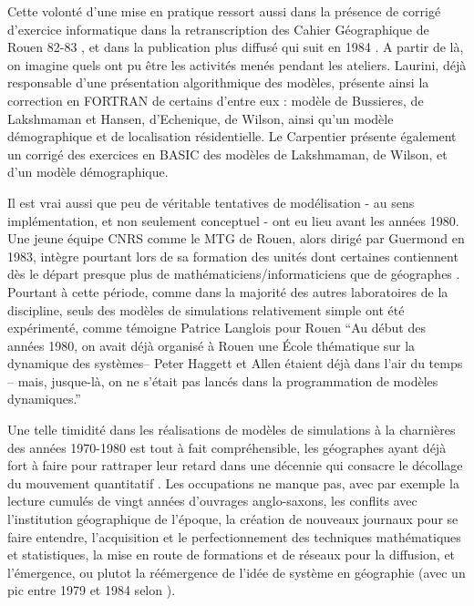 Cette volonté d'une mise en pratique ressort aussi dans la présence de corrigé d'exercice informatique dans la retranscription des Cahier Géographique de Rouen 82-83 \autocite{CGR1983}, et dans la publication plus diffusé qui suit en 1984 \autocite{Guermond1984}. A partir de là, on imagine quels ont pu être les activités menés pendant les ateliers. Laurini, déjà responsable d'une présentation algorithmique des modèles, présente ainsi la correction en FORTRAN de certains d'entre eux : modèle de Bussieres, de Lakshmaman et Hansen, d'Echenique, de Wilson, ainsi qu'un modèle démographique et de localisation résidentielle. Le Carpentier présente également un corrigé des exercices en BASIC des modèles de Lakshmaman, de Wilson, et d'un modèle démographique.

Il est vrai aussi que peu de véritable tentatives de modélisation - au sens implémentation, et non seulement conceptuel - ont eu lieu avant les années 1980. Une jeune équipe CNRS comme le MTG de Rouen, alors dirigé par Guermond en 1983, intègre pourtant lors de sa formation des unités dont certaines contiennent dès le départ presque plus de mathématiciens/informaticiens que de géographes . Pourtant à cette période, comme dans la majorité des autres laboratoires de la discipline, seuls des modèles de simulations relativement simple ont été expérimenté, comme témoigne Patrice Langlois pour Rouen \enquote{Au début des années 1980, on avait déjà organisé à Rouen une École thématique sur la dynamique des systèmes– Peter Haggett et Allen étaient déjà dans l’air du temps – mais, jusque-là, on ne s’était pas lancés dans la programmation de modèles dynamiques.} \autocite{Mathieu2014} 

Une telle timidité dans les réalisations de modèles de simulations à la charnières des années 1970-1980 est tout à fait compréhensible, les géographes ayant déjà fort à faire pour rattraper leur retard dans une décennie qui consacre le décollage du mouvement quantitatif \autocite{Cuyala2014, Orain2014}. Les occupations ne manque pas, avec par exemple la lecture cumulés de vingt années d'ouvrages anglo-saxons, les conflits avec l'institution géographique de l'époque, la création de nouveaux journaux pour se faire entendre, l'acquisition et le perfectionnement des techniques mathématiques et statistiques, la mise en route de formations et de réseaux pour la diffusion, et l'émergence, ou plutot la réémergence de l'idée de système en géographie (avec un pic entre 1979 et 1984 selon \textcite{Orain2001}).


